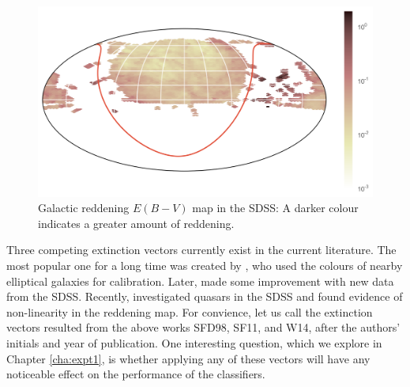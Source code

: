 \begin{figure}[tbp]
	\centering
	\includegraphics[width=\textwidth]{figures/2_astro/ebv_map}
	\caption[Galactic reddening map in the SDSS]{Galactic reddening $E(B-V)$ map in the SDSS:
		A darker colour indicates a greater amount of reddening.}
	\label{fig:reddening}
\end{figure}

Three competing extinction vectors currently exist in the current literature.
The most popular one for a long time was created by , who 
used the colours of nearby elliptical galaxies for calibration. Later, 
made some improvement with new data from the SDSS. Recently,  investigated
quasars in the SDSS and found evidence of non-linearity in the reddening map. For convience,
let us call the extinction vectors resulted from the above works SFD98, SF11, and W14, after
the authors' initials and year of publication.
One interesting question, which we explore in Chapter \ref{cha:expt1}, is whether
applying any of these vectors will have any noticeable effect on the performance of the classifiers.



